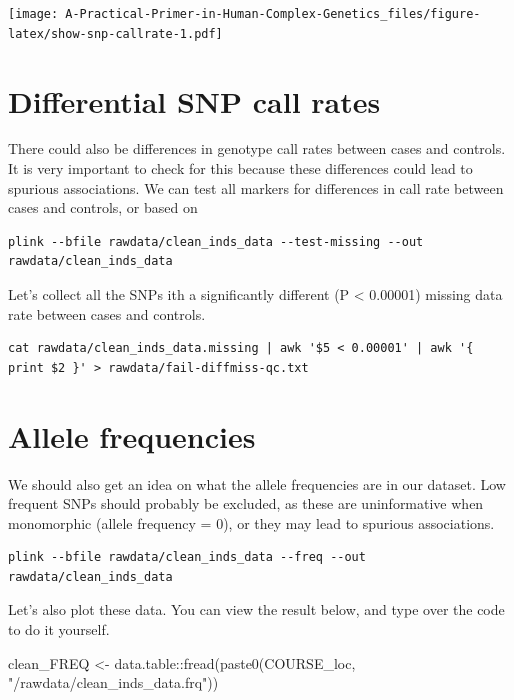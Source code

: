 \documentclass[
]{book}
\newenvironment{Shaded}{\begin{snugshade}}{\end{snugshade}}
\newcommand{\FunctionTok}[1]{\textcolor[rgb]{0.00,0.00,0.00}{#1}}
\newcommand{\NormalTok}[1]{#1}
\newcommand{\OtherTok}[1]{\textcolor[rgb]{0.56,0.35,0.01}{#1}}
\newcommand{\SpecialCharTok}[1]{\textcolor[rgb]{0.00,0.00,0.00}{#1}}
\newcommand{\StringTok}[1]{\textcolor[rgb]{0.31,0.60,0.02}{#1}}
\begin{document}
\texttt{[image: A-Practical-Primer-in-Human-Complex-Genetics\_files/figure-latex/show-snp-callrate-1.pdf]}

\hypertarget{differential-snp-call-rates}{%
\section{Differential SNP call rates}\label{differential-snp-call-rates}}

There could also be differences in genotype call rates between cases and controls. It is very important to check for this because these differences could lead to spurious associations. We can test all markers for differences in call rate between cases and controls, or based on

\begin{verbatim}
plink --bfile rawdata/clean_inds_data --test-missing --out rawdata/clean_inds_data
\end{verbatim}

Let's collect all the SNPs ith a significantly different (P \textless{} 0.00001) missing data rate between cases and controls.

\begin{verbatim}
cat rawdata/clean_inds_data.missing | awk '$5 < 0.00001' | awk '{ print $2 }' > rawdata/fail-diffmiss-qc.txt
\end{verbatim}

\hypertarget{allele-frequencies}{%
\section{Allele frequencies}\label{allele-frequencies}}

We should also get an idea on what the allele frequencies are in our dataset. Low frequent SNPs should probably be excluded, as these are uninformative when monomorphic (allele frequency = 0), or they may lead to spurious associations.

\begin{verbatim}
plink --bfile rawdata/clean_inds_data --freq --out rawdata/clean_inds_data
\end{verbatim}

Let's also plot these data. You can view the result below, and type over the code to do it yourself.

\begin{Shaded}
\begin{Highlighting}[]
\NormalTok{clean\_FREQ }\OtherTok{\textless{}{-}}\NormalTok{ data.table}\SpecialCharTok{::}\FunctionTok{fread}\NormalTok{(}\FunctionTok{paste0}\NormalTok{(COURSE\_loc, }\StringTok{"/rawdata/clean\_inds\_data.frq"}\NormalTok{))}
\end{Highlighting}
\end{Shaded}
\end{document}
